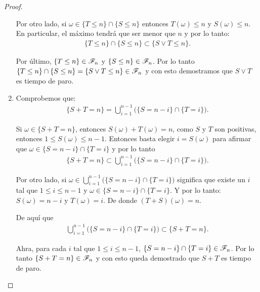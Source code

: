 \begin{proof}
\begin{enumerate}
							Por otro lado, si $\omega \in \{ T \leq n \} \cap \{ S \leq n\}$ entonces $T(\omega) \leq n$ y $S(\omega) \leq n$.
							En particular, el máximo tendrá que ser menor que $n$ y por lo tanto:
							\begin{align}
		                			\{ T \leq n \} \cap \{ S \leq n\} \subset \{ S \vee T \leq n \}.						
							\end{align}
							
							Por último, $\{ T \leq n \} \in \mathscr{F}_n$ y $\{ S \leq n \} \in \mathscr{F}_n$. Por lo tanto	\\	
							$\{ T \leq n \} \cap \{ S \leq n\} = \{ S \vee T \leq n \} \in \mathscr{F}_n$ y con esto demostramos que 
							$ S \vee T$ es tiempo de paro.\\
							
						\item
							Comprobemos que:
							\begin{align}
								\{ S + T = n \} = \bigcup_{i = 1}^{n-1} \bigg( \{S = n - i\} \cap \{T = i\} \bigg).
							\end{align}
							
							Si $\omega \in \{ S + T = n \}$, entonces $S(\omega) + T(\omega) = n$, como $S$ y $T$ son positivas,
							entonces $1 \leq S(\omega) \leq n-1$. Entonces basta elegir $i = S(\omega)$ para afirmar que 
							$\omega \in \{S = n - i\} \cap \{T = i\}$ y por lo tanto
							\begin{align}
							\{ S + T = n \} \subset \bigcup_{i = 1}^{n-1} \bigg( \{S = n - i\} \cap \{T = i\} \bigg).
							\end{align}
							
							Por otro lado, si $\omega \in \bigcup_{i = 1}^{n-1} \bigg( \{S = n - i\} \cap \{T = i\} \bigg)$
							significa que existe un $i$ tal que $1\leq i \leq n-1$ y $\omega \in \{S = n - i\} \cap \{T = i\}$.
							Y por lo tanto: $S(\omega) = n-i$ y $T(\omega) = i$. De donde $(T + S)(\omega) = n$.
							
							De aquí que
							\begin{align}
								\bigcup_{i = 1}^{n-1} \bigg( \{S = n - i\} \cap \{T = i\} \bigg) \subset \{ S + T = n \}. 
							\end{align}
							
							Ahra, para cada $i$ tal que $1 \leq i \leq n-1$, $\{S = n - i\} \cap \{T = i\} \in \mathscr{F}_n$.
							Por lo tanto $\{ S + T = n\} \in \mathscr{F}_n$ y con esto queda demostrado que $ S + T $ es tiempo de paro.
                	\end{enumerate}
                	

\end{proof}
